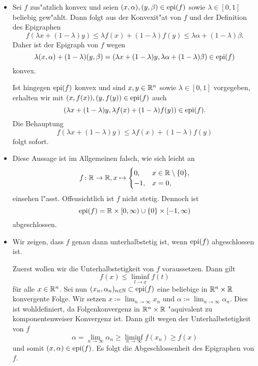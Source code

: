 \begin{itemize}
 \item[(i)] Sei $f$ zus"atzlich konvex und seien $(x,\alpha),(y,\beta)\in\operatorname{epi}(f)$ sowie $\lambda\in[0,1]$ beliebig gew"ahlt.
 Dann folgt aus der Konvexit"at von $f$ und der Definition des Epigraphen
 \begin{displaymath}
  f(\lambda x+(1-\lambda)y)\leq \lambda f(x)+(1-\lambda)f(y)\leq \lambda\alpha+(1-\lambda)\beta.
 \end{displaymath}
 Daher ist der Epigraph von $f$ wegen
 \[
\lambda(x,\alpha)+(1-\lambda)(y,\beta)=
(\lambda x+(1-\lambda)y,\lambda\alpha+(1-\lambda)\beta)\in\operatorname{epi}(f)
 \]
 konvex.

 Ist hingegen $\operatorname{epi}(f)$ konvex und sind $x,y\in\mathbb{R}^n$ sowie $\lambda\in[0,1]$ vorgegeben, erhalten wir mit
 $(x,f(x)),(y,f(y))\in\operatorname{epi}(f)$ auch
\[
 (\lambda x+(1-\lambda)y,\lambda f(x)+(1-\lambda)f(y))\in \operatorname{epi}(f).
 \]
 Die Behauptung
 \begin{displaymath}
  f(\lambda x+(1-\lambda)y)\leq\lambda f(x)+(1-\lambda)f(y)
 \end{displaymath}
 folgt sofort.

 \item[(ii)] Diese Aussage ist im Allgemeinen falsch, wie sich leicht an
 \begin{displaymath}
  f\colon\mathbb{R}\to\mathbb{R}, x\mapsto \begin{cases}
                       0, &x\in\mathbb{R}\setminus\{0\},\\
                       -1, &x=0,
                      \end{cases}
 \end{displaymath}
 einsehen l"asst. Offensichtlich ist $f$ nicht stetig. Dennoch ist
 \begin{displaymath}
  \operatorname{epi}(f)=\mathbb{R}\times[0,\infty)\cup\{0\}\times[-1,\infty)
 \end{displaymath}
 abgeschlossen.

 \item[(iii)]
 Wir zeigen, dass $f$ genau dann unterhalbstetig ist, wenn $\operatorname{epi}(f)$ abgeschlossen ist.

 Zuerst wollen wir die Unterhalbstetigkeit von $f$ voraussetzen. Dann gilt
 \begin{displaymath}
  f(x)\leq\liminf_{t\to x}f(t)
 \end{displaymath}
 für alle $x\in\mathbb{R}^n$. Sei nun $(x_n,\alpha_n)_{n\in\mathbb{N}}\subset\operatorname{epi}(f)$ eine beliebige in $\mathbb{R}^n\times\mathbb{R}$ konvergente Folge.
 Wir setzen $x\coloneqq \lim_{n\to\infty} x_n$ und $\alpha\coloneqq\lim_{n\to\infty}\alpha_n$.
 Dies ist wohldefiniert, da Folgenkonvergenz in $\mathbb{R}^n\times\mathbb{R}$ "aquivalent zu komponentenweiser Konvergenz ist. Dann gilt
 wegen der Unterhalbstetigkeit von $f$
 \begin{displaymath}
  \alpha= \lim_{n\to\infty}\alpha_n \geq \liminf_{n\to\infty} f(x_n)\geq f(x)
 \end{displaymath}
 und somit $(x,\alpha)\in\operatorname{epi}(f)$. Es folgt die Abgeschlossenheit des Epigraphen von $f$.


\end{itemize}
